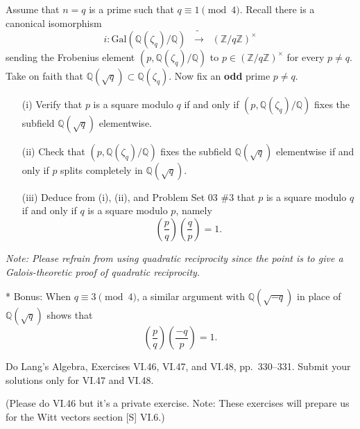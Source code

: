 \documentclass[12pt]{article}  %
\begin{document}
\begin{problem}[Problem 2]
Assume that $n = q$ is a prime such that $q \equiv 1 \pmod{4}$. Recall there is a canonical isomorphism
\[
i : \mathrm{Gal}(\mathbb{Q}(\zeta_q)/\mathbb{Q}) \;\;\widetilde{\longrightarrow}\;\; (\mathbb{Z}/q\mathbb{Z})^{\times}
\]
sending the Frobenius element $(p, \mathbb{Q}(\zeta_q)/\mathbb{Q})$ to $p \in (\mathbb{Z}/q\mathbb{Z})^{\times}$ for every $p \neq q$. 
Take on faith that $\mathbb{Q}(\sqrt{q}) \subset \mathbb{Q}(\zeta_q)$. Now fix an \textbf{odd} prime $p \neq q$. 

\begin{enumerate}
    \item[(i)] Verify that $p$ is a square modulo $q$ if and only if $(p, \mathbb{Q}(\zeta_q)/\mathbb{Q})$ fixes the subfield $\mathbb{Q}(\sqrt{q})$ elementwise.
    
    \item[(ii)] Check that $(p, \mathbb{Q}(\zeta_q)/\mathbb{Q})$ fixes the subfield $\mathbb{Q}(\sqrt{q})$ elementwise if and only if $p$ splits completely in $\mathbb{Q}(\sqrt{q})$.
    
    \item[(iii)] Deduce from (i), (ii), and Problem Set 03 \#3 that $p$ is a square modulo $q$ if and only if $q$ is a square modulo $p$, namely
    \[
    \left( \frac{p}{q} \right) \left( \frac{q}{p} \right) = 1.
    \]
\end{enumerate}

\noindent
\textit{Note: Please refrain from using quadratic reciprocity since the point is to give a Galois-theoretic proof of quadratic reciprocity.}

\medskip

\noindent
* Bonus: When $q \equiv 3 \pmod{4}$, a similar argument with $\mathbb{Q}(\sqrt{-q})$ in place of $\mathbb{Q}(\sqrt{q})$ shows that
\[
\left( \frac{p}{q} \right)\left( \frac{-q}{p} \right) = 1.
\]
\end{problem}

\begin{problem}[Problem 3]
Do Lang's Algebra, Exercises VI.46, VI.47, and VI.48, pp.\ 330--331. Submit your solutions only for VI.47 and VI.48.

\medskip
\noindent
(Please do VI.46 but it's a private exercise. Note: These exercises will prepare us for the Witt vectors section [S] VI.6.)
\end{problem}
\end{document}
